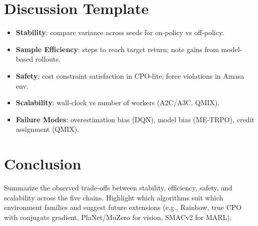 \documentclass[11pt]{article}
\begin{document}
\section{Discussion Template}
\begin{itemize}[leftmargin=*]
    \item \textbf{Stability}: compare variance across seeds for on-policy vs off-policy.
    \item \textbf{Sample Efficiency}: steps to reach target return; note gains from model-based rollouts.
    \item \textbf{Safety}: cost constraint satisfaction in CPO-lite; force violations in Amasa env.
    \item \textbf{Scalability}: wall-clock vs number of workers (A2C/A3C, QMIX).
    \item \textbf{Failure Modes}: overestimation bias (DQN), model bias (ME-TRPO), credit assignment (QMIX).
\end{itemize}

\section{Conclusion}
Summarize the observed trade-offs between stability, efficiency, safety, and scalability across the five chains. Highlight which algorithms suit which environment families and suggest future extensions (e.g., Rainbow, true CPO with conjugate gradient, PlaNet/MuZero for vision, SMACv2 for MARL).
\end{document}
